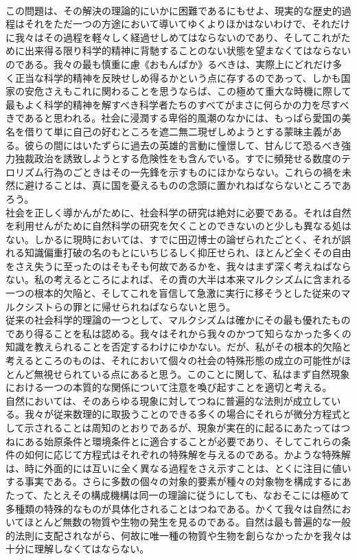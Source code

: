 \documentclass[8pt]{extreport}
\begin{document}
\begin{CJK}{UTF8}{min}
\\	この問題は、その解決の理論的にいかに困難であるにもせよ、現実的な歴史的過程はそれをただ一つの方途において導いてゆくよりほかはないわけで、それだけに我々はその過程を軽々しく経過せしめてはならないのであり、そしてこれがために出来得る限り科学的精神に背馳することのない状態を望まなくてはならないのである。我々の最も慎重に慮《おもんぱか》るべきは、実際上にどれだけ多く正当な科学的精神を反映せしめ得るかという点に存するのであって、しかも国家の安危さえもこれに関わることを思うならば、この極めて重大な時機に際して最もよく科学的精神を解すべき科学者たちのすべてがまさに何らかの力を尽すべきであると思われる。社会に浸潤する卑俗的風潮のなかには、もっぱら愛国の美名を借りて単に自己の好むところを遮二無二現ぜしめようとする蒙昧主義がある。彼らの間にはいたずらに過去の英雄的言動に憧憬して、甘んじて恐るべき強力独裁政治を誘致しようとする危険性をも含んでいる。すでに頻発せる数度のテロリズム行為のごときはその一先鋒を示すものにほかならない。これらの禍を未然に避けることは、真に国を憂えるものの念頭に置かれねばならないところであろう。
\\	社会を正しく導かんがために、社会科学の研究は絶対に必要である。それは自然を利用せんがために自然科学の研究を欠くことのできないのと少しも異なる処はない。しかるに現時においては、すでに田辺博士の論ぜられたごとく、それが誤れる知識偏重打破の名のもとにいちじるしく抑圧せられ、ほとんど全くその自由をさえ失うに至ったのはそもそも何故であるかを、我々はまず深く考えねばならない。私の考えるところによれば、その責の大半は本来マルクシズムに含まれる一つの根本的欠陥と、そしてこれを盲信して急激に実行に移そうとした従来のマルクシストらの罪とに帰せられねばならないと思う。
\\	従来の社会科学的理論の一つとして、マルクシズムは確かにその最も優れたものであり得ることを私は認める。我々はそれから我々のかつて知らなかった多くの知識を教えられることを否定するわけにゆかない。だが、私がその根本的欠陥と考えるところのものは、それにおいて個々の社会の特殊形態の成立の可能性がほとんど無視せられている点にあると思う。このことに関して、私はまず自然現象における一つの本質的な関係について注意を喚び起すことを適切と考える。
\\	自然においては、そのあらゆる現象に対してつねに普遍的な法則が成立している。我々が従来数理的に取扱うことのできる多くの場合にそれらが微分方程式として示されることは周知のとおりであるが、現象が実在的に起るにあたってはつねにある始原条件と環境条件とに適合することが必要であり、そしてこれらの条件の如何に応じて方程式はそれぞれの特殊解を与えるのである。かような特殊解は、時に外面的には互いに全く異なる過程をさえ示すことは、とくに注目に値いする事実である。さらに多数の個々の対象的要素が種々の対象物を構成するにあたって、たとえその構成機構は同一の理論に従うにしても、なおそこには極めて多種類の特殊的なものが具体化されることはつねである。かくて我々は自然においてほとんど無数の物質や生物の発生を見るのである。自然は最も普遍的な一般的法則に支配されながら、何故に唯一種の物質や生物を創らなかったかを我々は十分に理解しなくてはならない。

\end{CJK}
\end{document}
